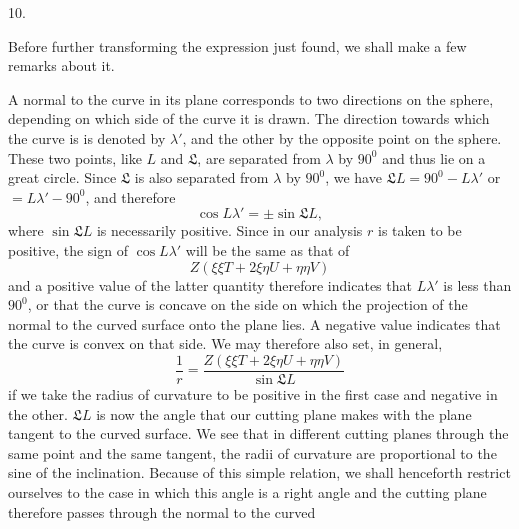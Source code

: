 %
\begin{center}10.\end{center}
\noindent\hspace*{1.2em}Before further transforming the expression just found, we shall make a few remarks about it.

A normal to the curve in its plane corresponds to two directions on the sphere, depending on which side of the curve it is drawn. The direction towards which the curve is  is denoted by $\lambda'$, and the other by the opposite point on the sphere. These two points, like $L$ and $\mathfrak{L}$, are separated from $\lambda$ by $90^{0}$ and thus lie on a great circle. Since $\mathfrak{L}$ is also separated from $\lambda$ by $90^{0}$, we have $\mathfrak{L}L=90^{0}-L\lambda'$ or $=L\lambda'-90^{0}$, and therefore
\[
\cos L\lambda'=\pm\sin\mathfrak{L}L,
\]
where $\sin\mathfrak{L}L$ is necessarily positive. Since in our analysis $r$ is taken to be positive, the sign of $\cos L\lambda'$ will be the same as that of
\[
Z(\xi\xi T+2\xi\eta U+\eta\eta V)
\]
and a positive value of the latter quantity therefore indicates that $L\lambda'$ is less than $90^{0}$, or that the curve is concave on the side on which the projection of the normal to the curved surface onto the plane lies. A negative value indicates that the curve is convex on that side. We may therefore also set, in general,
\[
\frac1r=\frac{Z(\xi\xi T+2\xi\eta U+\eta\eta V)}{\sin\mathfrak{L}L}
\]
if we take the radius of curvature to be positive in the first case and negative in the other. $\mathfrak{L}L$ is now the angle that our cutting plane makes with the plane tangent to the curved surface. We see that in different cutting planes through the same point and the same tangent, the radii of curvature are proportional to the sine of the inclination. Because of this simple relation, we shall henceforth restrict ourselves to the case in which this angle is a right angle and the cutting plane therefore passes through the normal to the curved\space%
